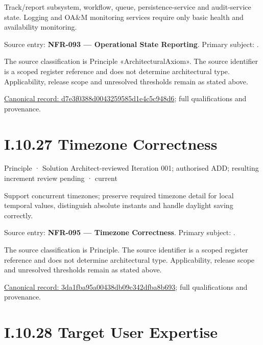 Track/report subsystem, workflow, queue, persistence-service and audit-service state. Logging and OA\&M monitoring services require only basic health and availability monitoring.



Source entry: \textbf{NFR-093 — Operational State Reporting}. Primary subject: \texttt{}.



The source classification is Principle «ArchitecturalAxiom». The source identifier is a scoped register reference and does not determine architectural type. Applicability, release scope and unresolved thresholds remain as stated above.


{\footnotesize \href{../../../../continuum/motivation/principle/architectural-axiom/d7e3f0388d0043259585d1e4c5c948d6.md}{Canonical record: d7e3f0388d0043259585d1e4c5c948d6}; full qualifications and provenance.}\par
\section*{I.10.27 Timezone Correctness}
\label{navigation:I.10.27}

\label{element:3da1fba95a00438db09c342dfba8b693}
{\small Principle · Solution Architect-reviewed Iteration 001; authorised ADD; resulting increment review pending · current}\par

Support concurrent timezones; preserve required timezone detail for local temporal values, distinguish absolute instants and handle daylight saving correctly.



Source entry: \textbf{NFR-095 — Timezone Correctness}. Primary subject: \texttt{}.



The source classification is Principle. The source identifier is a scoped register reference and does not determine architectural type. Applicability, release scope and unresolved thresholds remain as stated above.


{\footnotesize \href{../../../../continuum/motivation/principle/3da1fba95a00438db09c342dfba8b693.md}{Canonical record: 3da1fba95a00438db09c342dfba8b693}; full qualifications and provenance.}\par
\section*{I.10.28 Target User Expertise}
\label{navigation:I.10.28}

